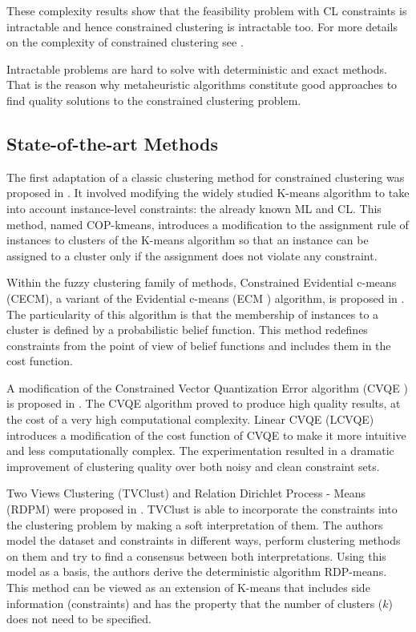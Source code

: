 \documentclass[review]{elsarticle}
\begin{document}
These complexity results show that the feasibility problem with CL constraints is intractable and hence constrained clustering is intractable too. For more details on the complexity of constrained clustering see \cite{davidson2005clustering}.

Intractable problems are hard to solve with deterministic and exact methods. That is the reason why metaheuristic algorithms constitute good approaches to find quality solutions to the constrained clustering problem.

\subsection{State-of-the-art Methods} \label{sec:BackSOTA}

The first adaptation of a classic clustering method for constrained clustering was proposed in \cite{wagstaff2001constrained}. It involved modifying the widely studied K-means algorithm to take into account instance-level constraints: the already known ML and CL. This method, named COP-kmeans, introduces a modification to the assignment rule of instances to clusters of the K-means algorithm so that an instance can be assigned to a cluster only if the assignment does not violate any constraint.

Within the fuzzy clustering family of methods, Constrained Evidential c-means (CECM), a variant of the Evidential c-means (ECM \cite{masson2008ecm}) algorithm, is proposed in \cite{antoine2012cecm}. The particularity of this algorithm is that the membership of instances to a cluster is defined by a probabilistic belief function. This method redefines constraints from the point of view of belief functions and includes them in the cost function.

A modification of the Constrained Vector Quantization Error algorithm (CVQE \cite{davidson2005clustering}) is proposed in \cite{pelleg2007k}. The CVQE algorithm proved to produce high quality results, at the cost of a very high computational complexity. Linear CVQE (LCVQE) introduces a modification of the cost function of CVQE to make it more intuitive and less computationally complex. The experimentation resulted in a dramatic improvement of clustering quality over both noisy and clean constraint sets.

Two Views Clustering (TVClust) and Relation Dirichlet Process - Means (RDPM) were proposed in \cite{khashabi2015clustering}. TVClust is able to incorporate the constraints into the clustering problem by making a soft interpretation of them. The authors model the dataset and constraints in different ways, perform clustering methods on them and try to find a consensus between both interpretations. Using this model as a basis, the authors derive the deterministic algorithm RDP-means. This method can be viewed as an extension of K-means that includes side information (constraints) and has the property that the number of clusters ($k$) does not need to be specified.
\end{document}
